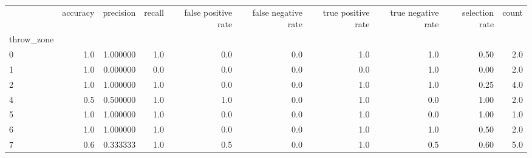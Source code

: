 \begin{tabular}{lrrrrrrrrr}
\toprule
{} &  accuracy &  precision &  recall &  false positive rate &  false negative rate &  true positive rate &  true negative rate &  selection rate &  count \\
throw\_zone &           &            &         &                      &                      &                     &                     &                 &        \\
\midrule
0          &       1.0 &   1.000000 &     1.0 &                  0.0 &                  0.0 &                 1.0 &                 1.0 &            0.50 &    2.0 \\
1          &       1.0 &   0.000000 &     0.0 &                  0.0 &                  0.0 &                 0.0 &                 1.0 &            0.00 &    2.0 \\
2          &       1.0 &   1.000000 &     1.0 &                  0.0 &                  0.0 &                 1.0 &                 1.0 &            0.25 &    4.0 \\
4          &       0.5 &   0.500000 &     1.0 &                  1.0 &                  0.0 &                 1.0 &                 0.0 &            1.00 &    2.0 \\
5          &       1.0 &   1.000000 &     1.0 &                  0.0 &                  0.0 &                 1.0 &                 0.0 &            1.00 &    1.0 \\
6          &       1.0 &   1.000000 &     1.0 &                  0.0 &                  0.0 &                 1.0 &                 1.0 &            0.50 &    2.0 \\
7          &       0.6 &   0.333333 &     1.0 &                  0.5 &                  0.0 &                 1.0 &                 0.5 &            0.60 &    5.0 \\
\bottomrule
\end{tabular}
